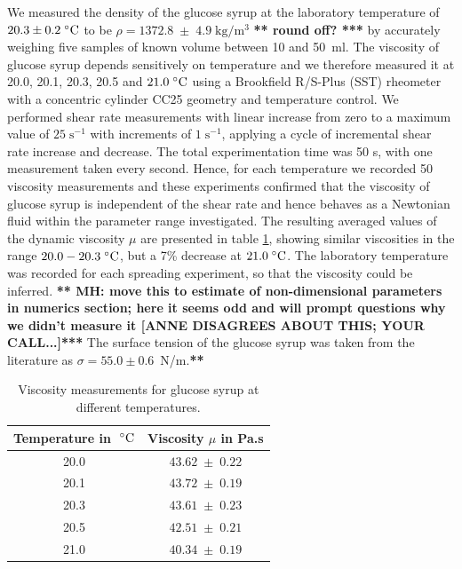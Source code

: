\documentclass[aip,graphicx]{revtex4-1}
\newcommand{\sym}[1]{\text{#1}} \newcommand{\dif}{\mathrm{d}}
\begin{document}
We measured the density of the glucose syrup at the laboratory temperature
of $20.3 \pm 0.2 \; ^{\circ} \text{C}$ to be $\rho=1372.8 \; \pm \; 4.9 \;
\sym{kg}/\sym{m}^3$ {\bf *** round off? ***}  by accurately weighing five samples of known
volume between 10 and 50~ml.  The viscosity of glucose syrup depends
sensitively on temperature \cite{llewellin2002rheology} and we
therefore measured it at 20.0, 20.1, 20.3, 20.5 and $21.0 \; ^{\circ} \text{C}$
using a Brookfield R/S-Plus (SST) rheometer with a concentric cylinder
CC25 geometry and temperature control. We performed shear rate
measurements with linear increase from zero to a maximum value of $25
\; \sym{s}^{-1}$ with increments of $1 \; \sym{s}^{-1}$, applying a
cycle of incremental shear rate increase and decrease.  The total
experimentation time was 50 s, with one measurement taken every
second. Hence, for each temperature we recorded 50 viscosity
measurements and these experiments confirmed that the viscosity of
glucose syrup is independent of the shear rate and hence behaves as a
Newtonian fluid within the parameter range investigated. The resulting
averaged values of the dynamic viscosity $\mu$ are presented in table
\ref{tab:glucose_viscosity}, showing similar viscosities in the range
$20.0 - 20.3 \; ^{\circ} \text{C}$, but a 7\% decrease at $21.0 \; ^{\circ} \text{C}$. The
laboratory temperature was recorded for each spreading experiment, so
that the viscosity could be inferred. {\bf ***  MH: move this to
  estimate of non-dimensional parameters in numerics section; here it
  seems odd and will prompt questions why we didn't measure it [ANNE
    DISAGREES ABOUT THIS; YOUR CALL...]***}
The surface tension of the glucose syrup was taken from the 
literature \cite{montanez2013influence} as $\sigma=55.0 \pm 0.6$~N/m.{\bf ***}


{\renewcommand{\arraystretch}{1.2}
 \begin{table}[!ht]
 \begin{center}
 \begin{tabular}{c | c}
  Temperature in $\; ^{\circ} \text{C}$ & Viscosity $\mu$ in Pa.s \\ \hline 20.0 &
  $43.62 \; \pm \; 0.22$ \\ 20.1 & $43.72 \; \pm \; 0.19$ \\ 20.3 &
  $43.61 \; \pm \; 0.23$ \\ 20.5 & $42.51 \; \pm \; 0.21$ \\ 21.0 &
  $40.34 \; \pm \; 0.19$\\
 \end{tabular}
 \caption{Viscosity measurements for glucose syrup at different
   temperatures.}
 \label{tab:glucose_viscosity}
 \end{center}
 \end{table}}
\end{document}
